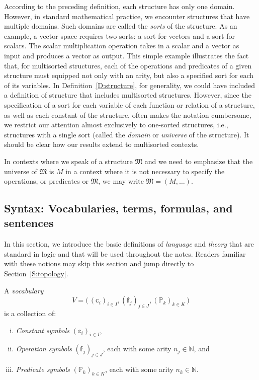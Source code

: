 \documentclass{scrartcl}
\begin{document}
According to the preceding definition, each structure has only one domain. However, in standard mathematical practice, we encounter structures that have multiple domains. Such domains are called the \emph{sorts} of the structure. As an example, a vector space requires two sorts: a sort for vectors and a sort for scalars. The scalar multiplication operation takes in a scalar and a vector as input and produces a vector as output. This simple example illustrates the fact that, for multisorted structures, each of the operations and predicates of a given structure must equipped not only with an arity, but also a specified sort for each of its variables. In Definition~\ref{D:structure}, for generality, we could have included a definition of structure that includes multisorted structures. However, since the specification of a sort for each variable of each function or relation of a structure, as well as each constant of the structure,  often makes the notation cumbersome, we restrict our attention almost exclusively to one-sorted structures, i.e., structures with a single sort (called the \emph{domain} or \emph{universe} of the structure). It should be clear how our results extend to multisorted contexts.



\begin{notation}
In contexts where we speak of a structure $\mathfrak{M}$ and we need to emphasize that the universe of $\mathfrak{M}$ is $M$ in a context where it is not necessary to specify the operations, or predicates or $\mathfrak{M}$, we may write $\mathfrak{M}=(M,\dots)$.
\end{notation}

\subsection{Syntax: Vocabularies, terms, formulas, and sentences}



In this section, we introduce the basic definitions of \emph{language} and \emph{theory} that are standard in logic and that will be used throughout the notes. Readers familiar with these notions may skip this section and jump directly to Section~\ref{S:topology}.


\begin{definition}
A \emph{vocabulary} 
\[
V = \big(\,(\mathbb{c}_i)_{i\in I}, (\mathbb{f}_j)_{j\in J}, (\mathbb{P}_k)_{k\in K}\,\big)
\]
is a collection of:
\begin{enumerate}[i)]
\item \emph{Constant symbols} $(\mathbb{c}_i)_{i\in I}$,
\item \emph{Operation symbols} $(\mathbb{f}_j)_{j\in J}$, each with some arity $n_j\in\mathbb{N}$, and
\item \emph{Predicate symbols} $(\mathbb{P}_k)_{k\in K}$, each with some arity $n_k\in\mathbb{N}$.
\end{enumerate}
\end{definition}
\end{document}
